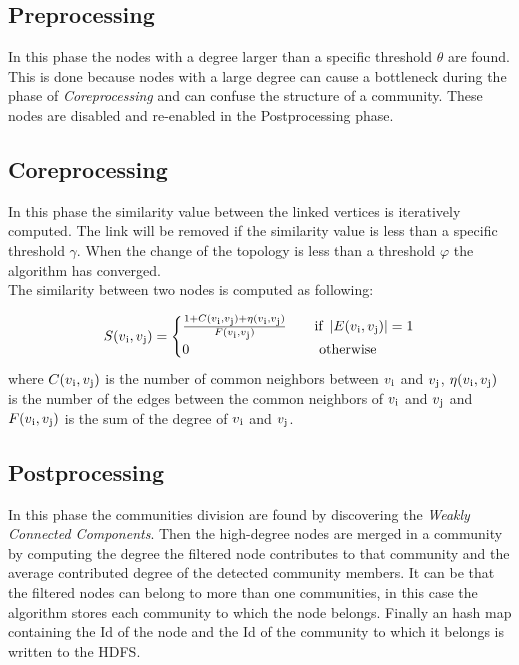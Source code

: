 \documentclass[12pt]{article}
\begin{document}
\subsection{Preprocessing}
In this phase the nodes with a degree larger than a specific threshold $\theta$ are found. This is done because nodes with a large degree can cause a bottleneck during the phase of \emph{Coreprocessing} and can confuse the structure of a community. These nodes are disabled and re-enabled in the Postprocessing phase.
\subsection{Coreprocessing}
In this phase the similarity value between the linked vertices is iteratively computed. The link will be removed if the similarity value is less than a specific threshold $\gamma$. When the change of the topology is less than a threshold $\varphi$ the algorithm has converged.\\
The similarity between two nodes is computed as following:

\begin{equation}
    S(v\textsubscript{i},v\textsubscript{j}) =
  \begin{cases}
      \frac{1 + C(v\textsubscript{i},v\textsubscript{j}) + \eta(v\textsubscript{i},v\textsubscript{j}) } {F(v\textsubscript{i},v\textsubscript{j}) }       & \quad \text{if } \left|E(v\textsubscript{i},v\textsubscript{j}) \right| = 1\\
              0  & \quad \text{ otherwise}\\
                \end{cases}
    \label{eq:1}
\end{equation}
where $C(v\textsubscript{i},v\textsubscript{j})$ is the number of common neighbors between $v\textsubscript{i}$ and $v\textsubscript{j}$, $\eta(v\textsubscript{i},v\textsubscript{j})$ is the number of the edges between the common neighbors of  $v\textsubscript{i}$ and $v\textsubscript{j}$ and $F(v\textsubscript{i},v\textsubscript{j})$ is the sum of the degree of
$v\textsubscript{i}$ and $v\textsubscript{j}$.
\subsection{Postprocessing}
In this phase the communities division are found by discovering the \emph{Weakly Connected Components}. Then the high-degree nodes are merged in a community by computing the degree the filtered node contributes to that community and the average contributed degree of the detected community members. It can be that the filtered nodes can belong to more than one communities, in this case the algorithm stores each community to which the node belongs. Finally an hash map containing the Id of the node and the Id of the community to which it belongs is written to the HDFS.
\end{document}
